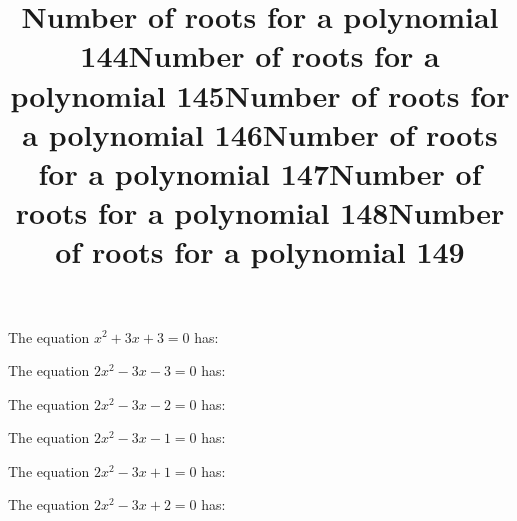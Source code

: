 \documentclass{article}
\begin{document}
\begin{category}
\begin{question}[multichoice]

\end{question}
\begin{question}[multichoice]
\title{Number of roots for a polynomial 144}
The equation $x^{2} + 3 x + 3=0$ has:


\end{question}
\begin{question}[multichoice]
\title{Number of roots for a polynomial 145}
The equation $2 x^{2} - 3 x - 3=0$ has:


\end{question}
\begin{question}[multichoice]
\title{Number of roots for a polynomial 146}
The equation $2 x^{2} - 3 x - 2=0$ has:


\end{question}
\begin{question}[multichoice]
\title{Number of roots for a polynomial 147}
The equation $2 x^{2} - 3 x - 1=0$ has:


\end{question}
\begin{question}[multichoice]
\title{Number of roots for a polynomial 148}
The equation $2 x^{2} - 3 x + 1=0$ has:


\end{question}
\begin{question}[multichoice]
\title{Number of roots for a polynomial 149}
The equation $2 x^{2} - 3 x + 2=0$ has:



\end{question}
\end{category}
\end{document}
